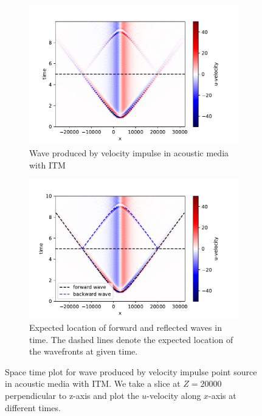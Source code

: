\begin{figure}[!htpb]
\begin{subfigure}[t]{0.49\textwidth}   
    \centering 
    \includegraphics[width=\textwidth]{figures/AcousticITM.pdf}
    \caption{Wave produced by velocity impulse in acoustic media with \ac{ITM}}
\end{subfigure}
\hfill
\begin{subfigure}[t]{0.49\textwidth}   
    \centering 
    \includegraphics[width=\textwidth]{figures/AcousticITMAnnotated.pdf}
    \caption{Expected location of forward and reflected waves in time. The dashed lines denote the expected location of the wavefronts at given time.}
    \label{subfig:acousticITMAnnotated}
\end{subfigure}
\caption{Space time plot for wave produced by velocity impulse point source in acoustic media with \ac{ITM}. We take a slice at $Z=20000$ perpendicular to z-axis
and plot the $u$-velocity along $x$-axis at different times.}
\label{fig:space-timeplot-acousticITM}
\end{figure}

